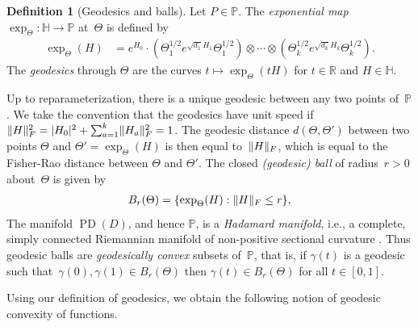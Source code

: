 \documentclass[aos]{imsart}
\theoremstyle{definition}
\newtheorem*{definition}{Definition}
\numberwithin{equation}{section}
\DeclareMathOperator{\PD}{PD}
\DeclarePairedDelimiter{\abs}{\lvert}{\rvert}
\DeclarePairedDelimiter{\norm}{\lVert}{\rVert}
\newcommand{\R}{{\mathbb{R}}}
\renewcommand{\P}{{\mathbb{P}}}
\renewcommand{\H}{{\mathbb{H}}}
\newcommand{\ot}{\otimes}
\begin{document}
\begin{definition}[Geodesics and balls]
Let $P\in\P$.
The \emph{exponential map} $\exp_\Theta \colon \H \to \P$ at~$\Theta$ is defined by
\begin{align*}
  \exp_\Theta(H) &= e^{H_0} \cdot ( \Theta_1^{1/2} e^{\sqrt{d_1} H_1} \Theta_1^{1/2}) \ot \cdots \ot (\Theta_k^{1/2} e^{\sqrt{d_k} H_k} \Theta_k^{1/2}).
\end{align*}
The \emph{geodesics} through $\Theta$ are the curves $t \mapsto \exp_\Theta(t H)$ for $t\in\R$ and $H\in\H$.


Up to reparameterization, there is a unique geodesic between any two points of~$\P$.
We take the convention that the geodesics have unit speed if $\norm{H}_F^2 = \abs{H_0}^2 + \sum_{a=1}^k \norm{H_a}_F^2 = 1$.
The geodesic distance $d(\Theta,\Theta')$ between two points $\Theta$ and $\Theta'=\exp_\Theta(H)$ is then equal to~$\norm H_F$, which is equal to the Fisher-Rao distance between $\Theta$ and $\Theta'$. The closed \emph{(geodesic) ball} of radius~$r>0$ about~$\Theta$ is given by
\begin{align*}
  B_r(\Theta) = \{ \exp_\Theta(H) : \norm H_F \leq r \},
\end{align*}
The manifold $\PD(D)$, and hence $\P$, is a \emph{Hadamard manifold}, i.e., a complete, simply connected Riemannian manifold of non-positive sectional curvature \citep{bacak2014convex}. Thus geodesic balls are \emph{geodesically convex} subsets of~$\P$, that is, if $\gamma(t)$ is a geodesic such that~$\gamma(0),\gamma(1) \in B_r(\Theta)$ then $\gamma(t) \in B_r(\Theta)$ for all $t\in[0,1]$.
\end{definition}

Using our definition of geodesics, we obtain the following notion of geodesic convexity of functions.
\end{document}
